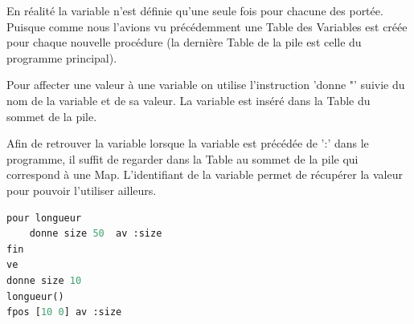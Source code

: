 \documentclass[a4paper,11pt]{article}
\begin{document}
En réalité la variable n'est définie qu'une seule fois pour chacune des portée. Puisque comme nous l'avions vu précédemment une Table des Variables est créée pour chaque nouvelle procédure (la dernière Table de la pile est celle du programme principal).

Pour affecter une valeur à une variable on utilise l'instruction 'donne "' suivie du nom de la variable et de sa valeur. La variable est inséré dans la Table du sommet de la pile.

Afin de retrouver la variable lorsque la variable est précédée de ':' dans le programme, il suffit de regarder dans la Table au sommet de la pile qui correspond à une Map. 
L'identifiant de la variable permet de récupérer la valeur pour pouvoir l'utiliser ailleurs.
\begin{lstlisting}[language=Python]
pour longueur
	donne size 50  av :size
fin
ve
donne size 10 
longueur() 
fpos [10 0] av :size
\end{lstlisting}
\end{document}
